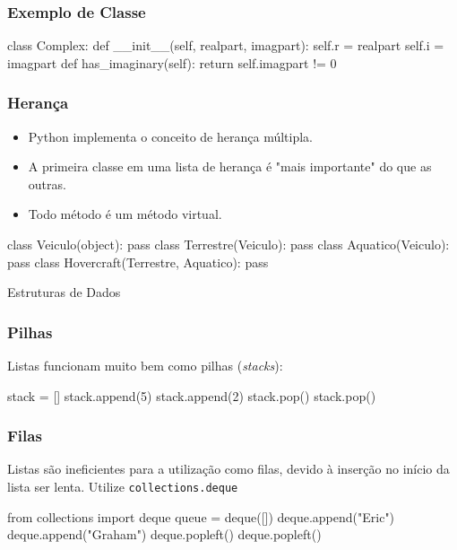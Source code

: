\documentclass[aspectratio=169,14pt]{beamer}
\begin{document}
\begin{frame}[fragile]
    \frametitle{Exemplo de Classe}
    \begin{python}
        class Complex:
            def __init__(self, realpart, imagpart):
                self.r = realpart
                self.i = imagpart
            def has_imaginary(self):
                return self.imagpart != 0
    \end{python}
\end{frame}

\begin{frame}[fragile]
    \frametitle{Herança}
    \begin{itemize}
        \item Python implementa o conceito de herança múltipla.
        \item A primeira classe em uma lista de herança é "mais
        importante" do que as outras.
        \item Todo método é um método virtual.
    \end{itemize}
    \begin{python}
        class Veiculo(object):
            pass
        class Terrestre(Veiculo):
            pass
        class Aquatico(Veiculo):
            pass
        class Hovercraft(Terrestre, Aquatico):
            pass
    \end{python}
\end{frame}

\begin{frame}
    \begin{center}
        \Huge Estruturas de Dados
    \end{center}
\end{frame}

\begin{frame}[fragile]
    \frametitle{Pilhas}
    Listas funcionam muito bem como pilhas (\textit{stacks}):
    \begin{python}
        stack = []
        stack.append(5)
        stack.append(2)
        stack.pop()
        stack.pop()
    \end{python}
\end{frame}

\begin{frame}[fragile]
    \frametitle{Filas}
    Listas são ineficientes para a utilização como filas, devido à
    inserção no início da lista ser lenta. Utilize
    \texttt{\color{green}collections.deque}
    \begin{python}
        from collections import deque
        queue = deque([])
        deque.append("Eric")
        deque.append("Graham")
        deque.popleft()
        deque.popleft()
    \end{python}
\end{frame}
\end{document}
